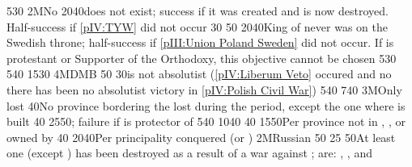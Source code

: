 %
%
%
{5}{30}{\EU@objBaltiqueTrade}%
%
\EUobjective2M{No }{}%
{20}{40}{\GE does not exist; success if it was created and is now
  destroyed. Half-success if \ref{pIV:TYW} did not occur}%
%
%
{}{30}{}%
%
%
{}{50}{\EU@objDMB}%
%
%
{20}{40}{King of  never was on the Swedish throne;
  half-success if \ref{pIII:Union Poland Sweden} did not occur. If
  \paysmajeurPologne is protestant or Supporter of the Orthodoxy, this
  objective cannot be chosen}%
%
%
%
{5}{30}{\EU@objBaltiqueTrade}%
%
%
{5}{40}{\EU@objEachCOLTP}%
%
%
{15}{30}{\EU@objNoRUSBaltique}%
%
\EUobjective4M{DMB}{}%
{}{50}{\EU@objDMB}%
%
%
{}{30}{\paysmajeurPologne is not absolutist (\ref{pIV:Liberum Veto} occured
  and no there has been no absolutist victory in \ref{pIV:Polish Civil War})}%
% 
%
%
{5}{40}{\EU@objBaltiqueTrade}%
%
%
{7}{40}{\EU@objEachCOLTP}%
%
\EUobjective3M{Only  lost}{}%
{}{40}{No province bordering the \regionBaltique lost during the period,
  except the one where  is built}%
%
%
{}{40}{\EU@objDMB}%
%
%
{25}{50}{\EU@objPOLVictory; failure if \paysmajeurFrance is protector of
  \paysPologne}%
%
%
%
{5}{40}{\EU@objBaltiqueTrade}%
%
%
{10}{40}{\EU@objEachCOLTP}%
%
%
{}{40}{}%
%
%
{15}{50}{Per province not in \regionNorvege, \regionDanemark, \regionFinlande
  or \regionSuede owned by \paysmajeurSuede}%
%
%
{}{40}{}%
%
 
%
%
{20}{40}{Per principality conquered (\payspskov or \paysryazan)}%
%
\EUobjective2M{Russian \provinceSmolenska}{}%
{}{50}{}%
%
%
{}{25}{}%
%
%
{}{50}{At least one  (except \paysSteppes) has been destroyed
  as a result of a war against \paysmajeurRussie;  are:
  \paysKazan, \paysAstrakhan, \paysCrimee and \paysCosaquesdon}%
